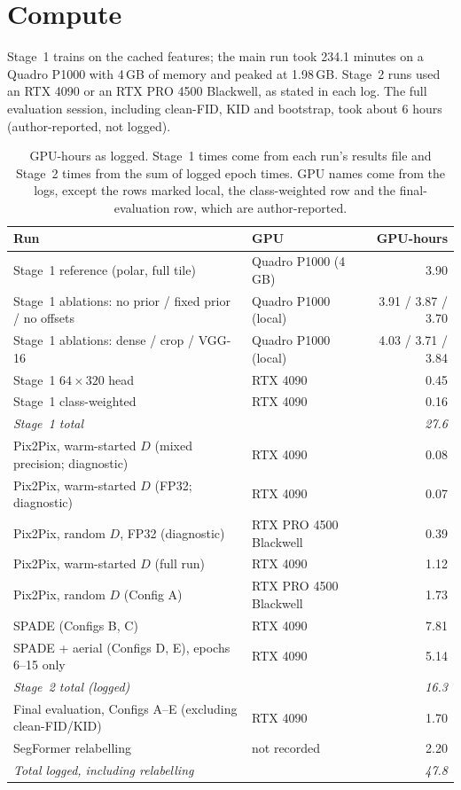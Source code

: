 \documentclass[11pt]{article}
\begin{document}
\section{Compute}
\label{app:compute}

Stage~1 trains on the cached features; the main run took 234.1 minutes on a Quadro P1000 with 4\,GB of memory
and peaked at 1.98\,GB. Stage~2 runs used an RTX 4090 or an RTX PRO 4500 Blackwell, as stated in each log. The
full evaluation session, including clean-FID, KID and bootstrap, took about 6 hours (author-reported, not
logged).

\begin{table}[h]
  \centering
  \small
  \caption{GPU-hours as logged. Stage~1 times come from each run's results file and Stage~2 times from the sum
  of logged epoch times. GPU names come from the logs, except the rows marked local, the class-weighted row and
  the final-evaluation row, which are author-reported.}
  \label{tab:compute}
  \setlength{\tabcolsep}{4pt}
  \begin{tabular}{@{}l l r@{}}
    \toprule
    Run & GPU & GPU-hours \\
    \midrule
    Stage~1 reference (polar, full tile) & Quadro P1000 (4\,GB) & 3.90 \\
    Stage~1 ablations: no prior / fixed prior / no offsets & Quadro P1000 (local) & 3.91 / 3.87 / 3.70 \\
    Stage~1 ablations: dense / crop / VGG-16 & Quadro P1000 (local) & 4.03 / 3.71 / 3.84 \\
    Stage~1 $64\times320$ head & RTX 4090 & 0.45 \\
    Stage~1 class-weighted & RTX 4090 & 0.16 \\
    \emph{Stage~1 total} & & \emph{27.6} \\
    \addlinespace
    Pix2Pix, warm-started $D$ (mixed precision; diagnostic) & RTX 4090 & 0.08 \\
    Pix2Pix, warm-started $D$ (FP32; diagnostic) & RTX 4090 & 0.07 \\
    Pix2Pix, random $D$, FP32 (diagnostic) & RTX PRO 4500 Blackwell & 0.39 \\
    Pix2Pix, warm-started $D$ (full run) & RTX 4090 & 1.12 \\
    Pix2Pix, random $D$ (Config A) & RTX PRO 4500 Blackwell & 1.73 \\
    SPADE (Configs B, C) & RTX 4090 & 7.81 \\
    SPADE + aerial (Configs D, E), epochs 6--15 only & RTX 4090 & 5.14 \\
    \emph{Stage~2 total (logged)} & & \emph{16.3} \\
    \addlinespace
    Final evaluation, Configs A--E (excluding clean-FID/KID) & RTX 4090 & 1.70 \\
    SegFormer relabelling & not recorded & 2.20 \\
    \midrule
    \emph{Total logged, including relabelling} & & \emph{47.8} \\
    \bottomrule
  \end{tabular}
\end{table}
\end{document}
